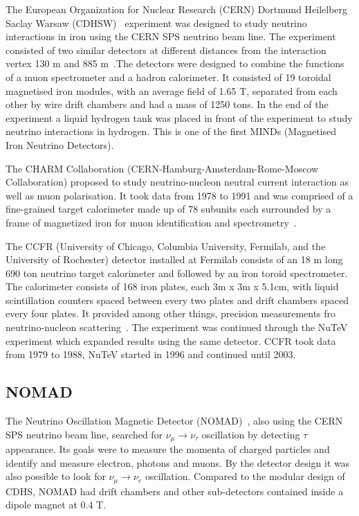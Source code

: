 The European Organization for Nuclear Research (CERN) Dortmund Heilelberg Saclay Warsaw (CDHSW)~\cite{40CDHSW} experiment was designed to study neutrino interactions in iron using the CERN SPS neutrino beam line. The experiment consisted of two similar detectors at different distances from the interaction vertex 130 m and 885 m~\cite{40CDHSW}.The detectors were designed to combine the functions of a muon spectrometer and a hadron calorimeter. It consisted of 19 toroidal magnetised iron modules, with an average field of 1.65 T, separated from each other by wire drift chambers and had a mass of 1250 tons. In the end of the experiment a liquid hydrogen tank was placed in front of the experiment to study neutrino interactions in hydrogen. This is one of the first MINDs (Magnetised Iron Neutrino Detectors).

The CHARM Collaboration (CERN-Hamburg-Amsterdam-Rome-Moscow Collaboration) proposed to study neutrino-nucleon neutral current interaction as well as muon polarisation. It took data from 1978 to 1991 and  was comprised of a fine-grained target calorimeter made up of 78 subunits each surrounded by a frame of magnetized iron for muon identification and spectrometry~\cite{68CHARM}.

The CCFR (University of Chicago, Columbia University, Fermilab, and the University of Rochester) detector installed at Fermilab consists of an 18 m long 690 ton neutrino target calorimeter and followed by an iron toroid spectrometer. The calorimeter consists of 168 iron plates, each 3m x 3m x 5.1cm, with liquid scintillation counters spaced between every two plates and drift chambers spaced every four plates. It provided among other things, precision measurements fro neutrino-nucleon scattering~\cite{67CCFR}. The experiment was continued through the NuTeV experiment which expanded results using the same detector. CCFR took data from 1979 to 1988, NuTeV started in 1996 and continued until 2003.

\subsection{NOMAD}
The Neutrino Oscillation Magnetic Detector (NOMAD)~\cite{NOMADexp}, also using the CERN SPS neutrino beam line, searched for $\nu_\mu \rightarrow \nu_\tau$ oscillation by detecting $\tau$ appearance. Its goals were to measure the momenta of charged particles and identify and measure electron, photons and muons. By the detector design it was also possible to look for $\nu_\mu \rightarrow \nu_e$ oscillation. Compared to the modular design of CDHS, NOMAD had drift chambers and other sub-detectors contained inside a dipole magnet at 0.4 T.


